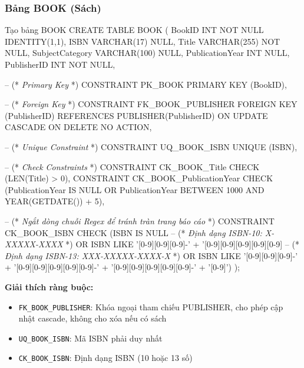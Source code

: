 \documentclass[12pt,a4paper]{article}
\newcommand{\vncomment}[1]{\textit{\color{green!50!black}#1}}
\begin{document}
\subsubsection{Bảng BOOK (Sách)}
\begin{sqlcode}{Tạo bảng BOOK}
CREATE TABLE BOOK (
    BookID             INT            NOT NULL   IDENTITY(1,1),
    ISBN               VARCHAR(17)    NULL,
    Title              VARCHAR(255)   NOT NULL,
    SubjectCategory    VARCHAR(100)   NULL,
    PublicationYear    INT            NULL,
    PublisherID        INT            NOT NULL,

    -- (* \vncomment{Primary Key} *)
    CONSTRAINT PK_BOOK PRIMARY KEY (BookID),

    -- (* \vncomment{Foreign Key} *)
    CONSTRAINT FK_BOOK_PUBLISHER FOREIGN KEY (PublisherID)
        REFERENCES PUBLISHER(PublisherID)
        ON UPDATE CASCADE
        ON DELETE NO ACTION,

    -- (* \vncomment{Unique Constraint} *)
    CONSTRAINT UQ_BOOK_ISBN UNIQUE (ISBN),

    -- (* \vncomment{Check Constraints} *)
    CONSTRAINT CK_BOOK_Title
        CHECK (LEN(Title) > 0),
    CONSTRAINT CK_BOOK_PublicationYear
        CHECK (PublicationYear IS NULL
               OR PublicationYear BETWEEN 1000 AND YEAR(GETDATE()) + 5),
    
    -- (* \vncomment{Ngắt dòng chuỗi Regex để tránh tràn trang báo cáo} *)
    CONSTRAINT CK_BOOK_ISBN
        CHECK (ISBN IS NULL
               -- (* \vncomment{Định dạng ISBN-10: X-XXXXX-XXXX} *)
               OR ISBN LIKE '[0-9][0-9][0-9]-' + 
                            '[0-9][0-9][0-9][0-9][0-9]%
               -- (* \vncomment{Định dạng ISBN-13: XXX-XXXXX-XXXX-X} *)
               OR ISBN LIKE '[0-9][0-9][0-9]-' + 
                            '[0-9][0-9][0-9][0-9][0-9]-' +
                            '[0-9][0-9][0-9][0-9][0-9]-' +
                            '[0-9]')
);
\end{sqlcode}

\textbf{Giải thích ràng buộc:}
\begin{itemize}
    \item \texttt{FK\_BOOK\_PUBLISHER}: Khóa ngoại tham chiếu PUBLISHER, cho phép cập nhật cascade, không cho xóa nếu có sách
    \item \texttt{UQ\_BOOK\_ISBN}: Mã ISBN phải duy nhất
    \item \texttt{CK\_BOOK\_ISBN}: Định dạng ISBN (10 hoặc 13 số)
\end{itemize}
\end{document}
